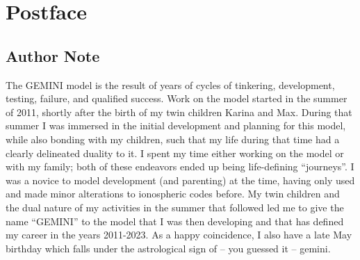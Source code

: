 \documentclass[11pt,letterpaper]{article}
\begin{document}
 




\section{Postface}

\subsection{Author Note}

The GEMINI model is the result of years of cycles of tinkering, development, testing, failure, and qualified success.  Work on the model started in the summer of 2011, shortly after the birth of my twin children Karina and Max.  During that summer I was immersed in the initial development and planning for this model, while also bonding with my children, such that my life during that time had a clearly delineated duality to it.  I spent my time either working on the model or with my family; both of these endeavors ended up being life-defining ``journeys''.  I was a novice to model development (and parenting) at the time, having only used and made minor alterations to ionospheric codes before.  My twin children and the dual nature of my activities in the summer that followed led me to give the name ``GEMINI'' to the model that I was then developing and that has defined my career in the years 2011-2023.  As a happy coincidence, I also have a late May birthday which falls under the astrological sign of -- you guessed it -- gemini.  
\end{document}
